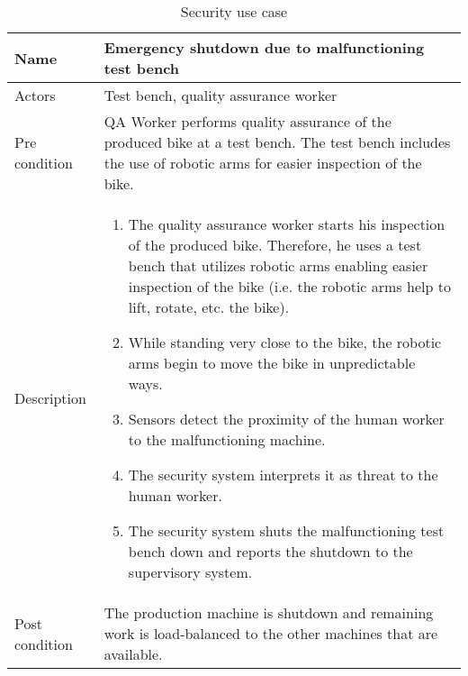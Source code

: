 \begin{table}[H]
\centering
\caption{Security use case}
\begin{tabular}{|l|p{8cm}|} \hline
Name & Emergency shutdown due to malfunctioning test bench \\ \hline
Actors & Test bench, quality assurance worker \\ \hline
Pre condition & QA Worker performs quality assurance of the produced bike at a test bench. The test bench includes the use of robotic arms for easier inspection of the bike.  \\ \hline
Description & \begin{enumerate} 
 \item The quality assurance worker starts his inspection of the produced bike. Therefore, he uses a test bench that utilizes robotic arms enabling easier inspection of the bike (i.e. the robotic arms help to lift, rotate, etc. the bike).
\item While standing very close to the bike, the robotic arms begin to move the bike in unpredictable ways.
\item Sensors detect the proximity of the human worker to the malfunctioning machine.
\item The security system interprets it as threat to the human worker.
\item The security system shuts the malfunctioning test bench down and reports the shutdown to the supervisory system.
\end{enumerate} \\ \hline
Post condition & The production machine is shutdown and remaining work is load-balanced to the other machines that are available. \\
\hline
\end{tabular}
\end{table}

